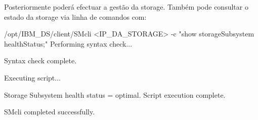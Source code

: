 Posteriormente poderá efectuar a gestão da storage. Também pode consultar o estado da storage via linha de comandos com:

\begin{Output}[commandchars=\\\{\}]
/opt/IBM\_DS/client/SMcli <IP\_DA\_STORAGE>  -c "show storageSubsystem healthStatus;"
Performing syntax check...

Syntax check complete.

Executing script...

Storage Subsystem health status = optimal.
Script execution complete.

SMcli completed successfully.
\end{Output}
